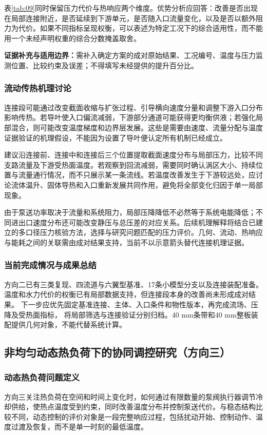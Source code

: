 \documentclass[stage2,UTF8,fontset=fandol]{ydzjreport}
\newcommand{\pending}[1]{\par\noindent\textbf{证据补充与适用边界：}#1\par}
\begin{document}
表\ref{tab:09}同时保留压力代价与热响应两个维度。优势分析应回答：改善是否出现在局部连接附近，是否延续到下游单元，是否随入口流量变化，以及是否以额外阻力为代价。如果不同指标呈现权衡，可以表述为特定工况下的综合适用性，而不能用一个未经声明权重的综合分数掩盖取舍。
\pending{需补入确定方案的成对原始结果、工况编号、温度与压力监测位置、比较约束及误差；不得填写未经提供的提升百分比。}

\subsubsection{流动传热机理讨论}
连接段可能通过改变截面收缩与扩张过程、引导横向速度分量和调整下游入口分布影响传热。若导叶使入口偏流减弱，下游部分通道可能获得更均衡供液；若强化局部混合，则可能改变温度梯度和边界层发展。这些是需要由速度、流量分配与温度证据验证的机理假设，不能因为设置了导叶便认定所有机制已经成立。

建议沿连接前、连接中和连接后三个位置提取截面速度分布与局部压力，比较不同支路流量及下游受热面温度。若观察到回流减弱，需要同时确认涡区大小、持续位置与流量通行情况，而不只展示某一条流线。若温度改善发生于下游较远处，应讨论流体温升、固体导热和入口重新发展共同作用，避免将全部变化归因于单一局部现象。

由于泵送功率取决于流量和系统阻力，局部压降降低不必然等于系统电能降低；不同进出口速度分布还可能改变静压与总压差的对应关系。后续机理解释将结合已建立的多口径压力核验方法，选择与研究问题匹配的压力评价。几何、流动、热响应与能耗之间的关联需由成对结果支持，当前不以示意箭头替代连接机理证据。

\subsubsection{当前完成情况与成果总结}

方向二已有三类复现、四流道与六翼型基准、17条小模型分支以及连接装配准备。
温度和水力代价的权衡已有局部数据支持，但连接段本身的改善尚未形成成对结果。
下一步应优先固定基准连接、主体、入口条件和物性版本，再完成流场、压降及受热面指标，
将局部筛选与连接验证分别归档。40 mm条带和40 mm整板装配提供几何对象，不能代替系统计算。

\subsection{非均匀动态热负荷下的协同调控研究（方向三）}
\label{ch:control}
\subsubsection{动态热负荷问题定义}
方向三关注热负荷在空间和时间上变化时，如何通过有限数量的泵阀执行器调节冷却供给，使热点温度受到约束，同时改善温度分布并控制泵送代价。与稳态结构比较不同，动态控制的评价对象是一段完整响应过程，包括扰动开始、控制动作、温度过渡及恢复，而不是单一时刻的最低温度。
\end{document}
